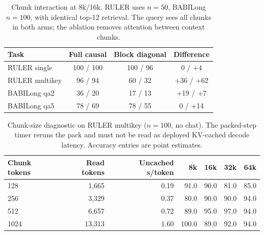 \begin{table}[htbp]
\centering
\small
\setlength{\tabcolsep}{4pt}
\begin{tabular}{@{}lccc@{}}
\toprule
Task & Full causal & Block diagonal & Difference \\
\midrule
RULER single & 100 / 100 & 100 / 96 & 0 / +4 \\
RULER multikey & 96 / 94 & 60 / 32 & +36 / +62 \\
BABILong qa2 & 36 / 20 & 17 / 13 & +19 / +7 \\
BABILong qa5 & 78 / 69 & 78 / 55 & 0 / +14 \\
\bottomrule
\end{tabular}
\caption{Chunk interaction at 8k/16k. RULER uses $n=50$, BABILong $n=100$, with identical top-12 retrieval. The query sees all chunks in both arms; the ablation removes attention between context chunks.}
\label{tab:attention-detail}
\end{table}

\begin{table}[htbp]
\centering
\small
\setlength{\tabcolsep}{4pt}
\begin{tabular}{@{}lrrrrrr@{}}
\toprule
Chunk tokens & Read tokens & Uncached s/token & 8k & 16k & 32k & 64k \\
\midrule
128 & 1,665 & 0.19 & 91.0 & 90.0 & 81.0 & 85.0 \\
256 & 3,329 & 0.37 & 80.0 & 90.0 & 90.0 & 94.0 \\
512 & 6,657 & 0.72 & 89.0 & 95.0 & 97.0 & 94.0 \\
1024 & 13,313 & 1.60 & 100.0 & 89.0 & 92.0 & 94.0 \\
\bottomrule
\end{tabular}
\caption{Chunk-size diagnostic on RULER multikey ($n=100$, no chat). The packed-step timer reruns the pack and must not be read as deployed KV-cached decode latency. Accuracy entries are point estimates.}
\label{tab:chunk-size}
\end{table}
